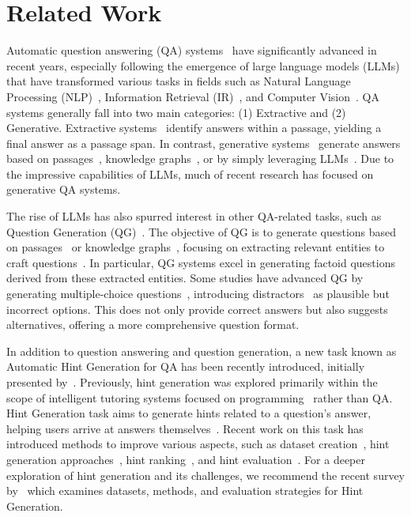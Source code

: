 \section{Related Work}
\label{s:related_work}
Automatic question answering (QA) systems~\cite{10.1145/3560260, DBLP:journals/ftir/MaviJJ24, abdel2023deep} have significantly advanced in recent years, especially following the emergence of large language models (LLMs) that have transformed various tasks in fields such as Natural Language Processing (NLP)~\cite{10.5555/3495724.3495883, 10.5555/3648699.3648939}, Information Retrieval (IR)~\cite{sachan-etal-2022-improving, sun-etal-2023-chatgpt}, and Computer Vision~\cite{pmlr-v139-ramesh21a, 2024arXiv240608394W}. QA systems generally fall into two main categories: (1) Extractive and (2) Generative. Extractive systems~\cite{9991478, 2020arXiv201008983R} identify answers within a passage, yielding a final answer as a passage span. In contrast, generative systems~\cite{yu2023generate, Chen_Lin_Han_Sun_2024} generate answers based on passages~\cite{10.1007/s10791-023-09420-7, 2021arXiv211006393X}, knowledge graphs~\cite{wang-etal-2021-generative, 10.1007/978-3-031-43415-0_35}, or by simply leveraging LLMs~\cite{li-etal-2024-self-prompting}. Due to the impressive capabilities of LLMs, much of recent research has focused on generative QA systems.

The rise of LLMs has also spurred interest in other QA-related tasks, such as Question Generation (QG)~\cite{10.1007/s13748-023-00295-9, Goyal2024}. The objective of QG is to generate questions based on passages~\cite{10.1145/3468889} or knowledge graphs~\cite{9621874}, focusing on extracting relevant entities to craft questions~\cite{fabbri-etal-2020-template}. In particular, QG systems excel in generating factoid questions~\cite{Abdallah2023} derived from these extracted entities. Some studies have advanced QG by generating multiple-choice questions~\cite{2024arXiv240802114F}, introducing distractors~\cite{2024arXiv240201512A} as plausible but incorrect options. This does not only provide correct answers but also suggests alternatives, offering a more comprehensive question format.

In addition to question answering and question generation, a new task known as Automatic Hint Generation for QA has been recently introduced, initially presented by~\citet{jatowt_kg_hint}. Previously, hint generation was explored primarily within the scope of intelligent tutoring systems focused on programming~\cite{10.1145/3469885, 10.1007/978-3-540-69132-7_41, Kochmar2022, Price2019} rather than QA. Hint Generation task aims to generate hints related to a question’s answer, helping users arrive at answers themselves~\cite{jatowt_kg_hint}. Recent work on this task has introduced methods to improve various aspects, such as dataset creation~\cite{mozafari-triviahg, mozafari-hintqa}, hint generation approaches~\cite{mozafari-triviahg, mozafari-hintqa}, hint ranking~\cite{2024arXiv241201626M}, and hint evaluation~\cite{mozafari-triviahg}. For a deeper exploration of hint generation and its challenges, we recommend the recent survey by~\citet{2024arXiv240404728J} which examines datasets, methods, and evaluation strategies for Hint Generation.

